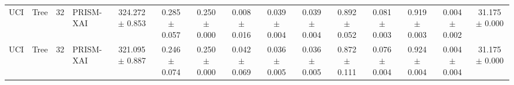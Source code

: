 \begin{table}[t]
\begin{tabular}{llllccccccccccc}
UCI & Tree & 32 & PRISM-XAI & 324.272 $\pm$ 0.853 & 0.285 $\pm$ 0.057 & 0.250 $\pm$ 0.000 & 0.008 $\pm$ 0.016 & 0.039 $\pm$ 0.004 & 0.039 $\pm$ 0.004 & 0.892 $\pm$ 0.052 & 0.081 $\pm$ 0.003 & 0.919 $\pm$ 0.003 & 0.004 $\pm$ 0.002 & 31.175 $\pm$ 0.000 \\
UCI & Tree & 32 & PRISM-XAI & 321.095 $\pm$ 0.887 & 0.246 $\pm$ 0.074 & 0.250 $\pm$ 0.000 & 0.042 $\pm$ 0.069 & 0.036 $\pm$ 0.005 & 0.036 $\pm$ 0.005 & 0.872 $\pm$ 0.111 & 0.076 $\pm$ 0.004 & 0.924 $\pm$ 0.004 & 0.004 $\pm$ 0.004 & 31.175 $\pm$ 0.000 \\
\bottomrule
\end{tabular}
\end{table}
